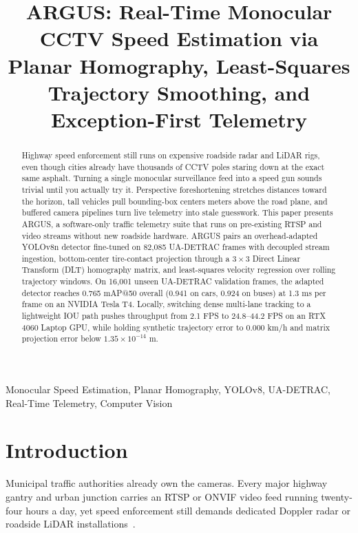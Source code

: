 \documentclass[conference]{IEEEtran}
\title{ARGUS: Real-Time Monocular CCTV Speed Estimation via Planar Homography, Least-Squares Trajectory Smoothing, and Exception-First Telemetry}
\author{
  \IEEEauthorblockN{Akash M Acharya}
  \IEEEauthorblockA{
    \textit{Dept. of CSE(AIML)}\\
    \textit{Sahyadri College of Engineering and Management}\\
    Mangaluru, India
  }
}
\begin{document}
\maketitle

\begin{abstract}
Highway speed enforcement still runs on expensive roadside radar and LiDAR rigs, even though cities already have thousands of CCTV poles staring down at the exact same asphalt. Turning a single monocular surveillance feed into a speed gun sounds trivial until you actually try it. Perspective foreshortening stretches distances toward the horizon, tall vehicles pull bounding-box centers meters above the road plane, and buffered camera pipelines turn live telemetry into stale guesswork. This paper presents ARGUS, a software-only traffic telemetry suite that runs on pre-existing RTSP and video streams without new roadside hardware. ARGUS pairs an overhead-adapted YOLOv8n detector fine-tuned on 82,085 UA-DETRAC frames with decoupled stream ingestion, bottom-center tire-contact projection through a $3\times 3$ Direct Linear Transform (DLT) homography matrix, and least-squares velocity regression over rolling trajectory windows. On 16,001 unseen UA-DETRAC validation frames, the adapted detector reaches 0.765 mAP@50 overall (0.941 on cars, 0.924 on buses) at 1.3 ms per frame on an NVIDIA Tesla T4. Locally, switching dense multi-lane tracking to a lightweight IOU path pushes throughput from 2.1 FPS to 24.8--44.2 FPS on an RTX 4060 Laptop GPU, while holding synthetic trajectory error to 0.000 km/h and matrix projection error below $1.35\times 10^{-14}$ m.
\end{abstract}

\begin{IEEEkeywords}
Monocular Speed Estimation, Planar Homography, YOLOv8, UA-DETRAC, Real-Time Telemetry, Computer Vision
\end{IEEEkeywords}

\section{Introduction}
Municipal traffic authorities already own the cameras. Every major highway gantry and urban junction carries an RTSP or ONVIF video feed running twenty-four hours a day, yet speed enforcement still demands dedicated Doppler radar or roadside LiDAR installations~\cite{sochor2018brnocompspeed}.
\end{document}
